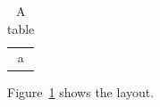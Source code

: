 \documentclass{article}
\begin{document}
\begin{table}[h]
\centering
\begin{tabular}{c} a \end{tabular}
\caption{A table}\label{tab:main}
\end{table}
Figure~\ref{tab:main} shows the layout.
\end{document}

